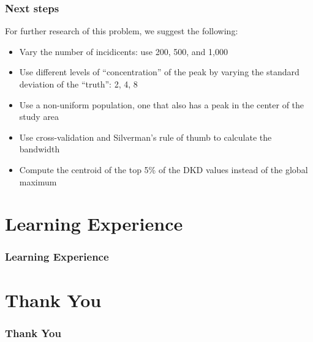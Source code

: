 \documentclass{beamer}
\begin{document}
\begin{frame}\frametitle{Next steps}
     For further research of this problem, we suggest the following:
     \begin{itemize}
         \item Vary the number of incidicents: use 200, 500, and 1,000
         \item Use different levels of ``concentration'' of the peak by varying the standard deviation of the ``truth'': 2, 4, 8
         \item Use a non-uniform population, one that also has a peak in the center of the study area
         \item Use cross-validation and Silverman's rule of thumb to calculate the bandwidth
         \item Compute the centroid of the top 5\% of the DKD values instead of the global maximum
     \end{itemize}
\end{frame}

\section{Learning Experience}
\begin{frame}\frametitle{Learning Experience}
\end{frame}

\section{Thank You}

\begin{frame}\frametitle{Thank You}
\end{frame}
\end{document}
